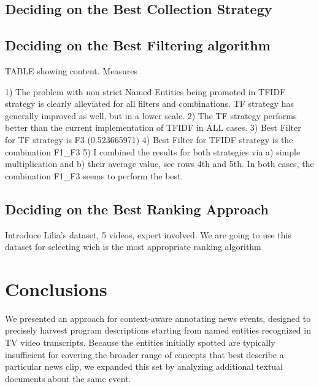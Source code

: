 \documentclass{llncs}
\begin{document}
\subsection{Deciding on the Best Collection Strategy}

\subsection{Deciding on the Best Filtering algorithm}
\label{sec:FilteringExperiments}

TABLE showing content. Measures

1) The problem with non strict Named Entities being promoted in TFIDF strategy is clearly alleviated for all filters and combinations. TF strategy has generally improved as well, but in a lower scale. 
2) The TF strategy performs better than the current implementation of TFIDF in ALL cases.
3) Best Filter for TF strategy is F3 (0.523665971)
4) Best Filter for TFIDF strategy is the combination F1\_F3 
5) I combined the results for both strategies via a) simple multiplication and b) their average value, see rows 4th and 5th. In both cases, the combination F1\_F3 seems to perform the best.



\subsection{Deciding on the Best Ranking Approach}
\label{sec:decidingRanking}

Introduce Lilia's dataset, 5 videos, expert involved. We are going to use this dataset for selecting wich is the most appropriate ranking algorithm





\section{Conclusions}
\label{sec:conclusions}

We presented an approach for context-aware annotating news events, designed to precisely harvest program descriptions starting from named entities recognized in TV video transcripts. Because the entities initially spotted are typically insufficient for covering the broader range of concepts that best describe a particular news clip, we expanded this set by analyzing additional textual documents about the same event.
\end{document}
